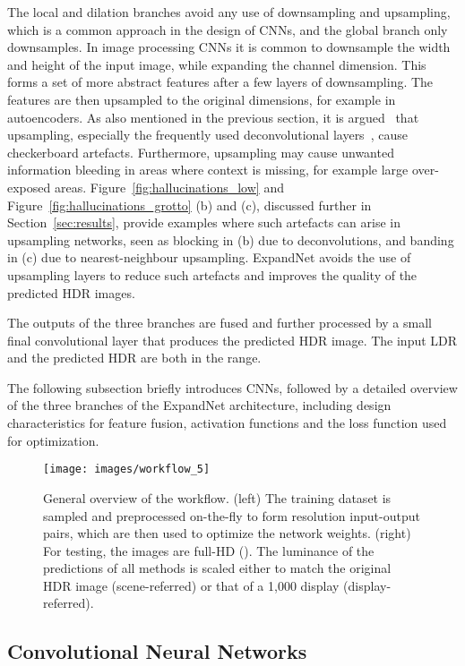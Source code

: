\documentclass{egpubl}
\newcommand{\tc}[1]{{#1}}
\begin{document}
The local and dilation branches avoid any use of downsampling and upsampling, which is a common approach in the design of CNNs, and the global branch
only downsamples. In image processing CNNs it is common to downsample the width and height of the input image, while expanding the channel dimension.
This forms a set of more abstract features after a few layers of downsampling. The features are then upsampled to the original dimensions, for
example in autoencoders. \tc{As also mentioned in the previous section, it is} argued~\cite{odena2016deconvolution} that upsampling, especially the frequently used deconvolutional
layers~\cite{shi2016deconv}, cause checkerboard artefacts. Furthermore, upsampling may cause unwanted information bleeding in areas where context is
missing, for example large over-exposed areas. Figure~\ref{fig:hallucinations_low} and Figure~\ref{fig:hallucinations_grotto} (b) and (c), discussed further in Section~\ref{sec:results},
provide examples where such artefacts can arise in upsampling networks, seen as blocking in (b) due to deconvolutions, and banding in (c) due to
nearest-neighbour upsampling. ExpandNet avoids the use of upsampling layers to reduce such artefacts and improves the quality of the predicted HDR
images.

The outputs of the three branches are fused and further processed by a small
final convolutional layer that produces the predicted HDR image. The input LDR
and the predicted HDR are both in the  range.

The following subsection briefly introduces CNNs, followed by a detailed
overview of the three branches of the ExpandNet architecture, including design
characteristics for feature fusion, activation functions and the loss function
used for optimization.

\begin{figure*}[htb]
    \centering
    \texttt{[image: images/workflow\_5]}
    \caption{General overview of the workflow. (left) The training dataset is
    sampled and preprocessed on-the-fly to form  resolution
    input-output pairs, which are then used to optimize the network weights.
    (right) For testing, the images are full-HD (). The
    luminance of the predictions of all methods is scaled either to match the
    original HDR image (scene-referred) or that of a 1,000  display
    (display-referred).}\label{fig:workflow}
\end{figure*}

\subsection{\textbf{Convolutional Neural Networks}}
\end{document}
